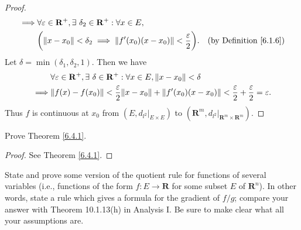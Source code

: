 \begin{proof}
\begin{align*}
        \implies & \forall \varepsilon \in \mathbf{R}^+, \exists\ \delta_2 \in \mathbf{R}^+ : \forall x \in E,                                                    \\
                 & \bigg(\norm*{x - x_0} < \delta_2 \implies \norm*{f'(x_0)(x - x_0)} < \frac{\varepsilon}{2}\bigg).         & \text{(by Definition \ref{6.1.6})}
    \end{align*}
    Let \(\delta = \min(\delta_1, \delta_2, 1)\).
    Then we have
    \begin{align*}
                 & \forall \varepsilon \in \mathbf{R}^+, \exists\ \delta \in \mathbf{R}^+ : \forall x \in E, \norm*{x - x_0} < \delta                                      \\
        \implies & \norm*{f(x) - f(x_0)} < \frac{\varepsilon}{2} \norm*{x - x_0} + \norm*{f'(x_0)(x - x_0)} < \frac{\varepsilon}{2} + \frac{\varepsilon}{2} = \varepsilon.
    \end{align*}
    Thus \(f\) is continuous at \(x_0\) from \((E, d_{l^2}|_{E \times E})\) to \((\mathbf{R}^m, d_{l^2}|_{\mathbf{R}^m \times \mathbf{R}^m})\).
\end{proof}

\begin{exercise}\label{ex 6.4.3}
    Prove Theorem \ref{6.4.1}.
\end{exercise}

\begin{proof}
    See Theorem \ref{6.4.1}.
\end{proof}

\begin{exercise}\label{ex 6.4.4}
    State and prove some version of the quotient rule for functions of several variables (i.e., functions of the form \(f : E \to \mathbf{R}\) for some subset \(E\) of \(\mathbf{R}^n\)).
    In other words, state a rule which gives a formula for the gradient of \(f / g\);
    compare your answer with Theorem 10.1.13(h) in Analysis I.
    Be sure to make clear what all your assumptions are.
\end{exercise}

